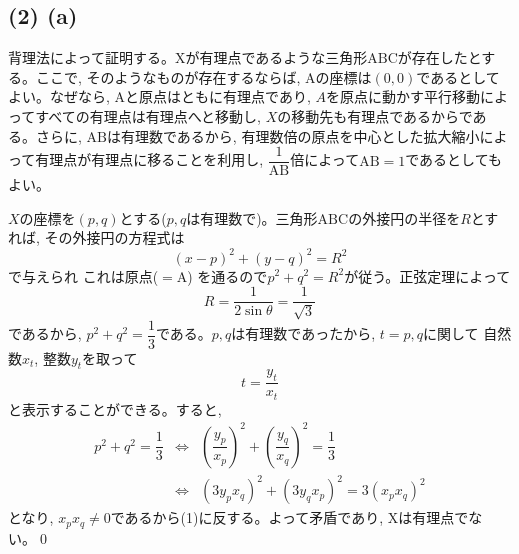 \documentclass[twocolumn]{jbook}
\theoremstyle{definition}
\newcommand{\beqn}{\begin{eqnarray*}}
\newcommand{\eeqn}{\end{eqnarray*}}
\newcommand{\mr}{\mathrm}
\newcommand{\parena}[1]{\left( #1\right)}
\begin{document}
\subsection*{(2) (a)} 背理法によって証明する。$\mr{X}$が有理点であるような三角形$\mr{ABC}$が存在したとする。ここで, そのようなものが存在するならば, $\mr{A}$の座標は$(0,0)$であるとしてよい。なぜなら, $\mr{A}$と原点はともに有理点であり, $A$を原点に動かす平行移動によってすべての有理点は有理点へと移動し, $X$の移動先も有理点であるからである。さらに, $\mr{AB}$は有理数であるから, 有理数倍の原点を中心とした拡大縮小によって有理点が有理点に移ることを利用し, $\dfrac{1}{\mr{AB}}$倍によって$\mr{AB}=1$であるとしてもよい。\par
$X$の座標を$(p,q)$とする($p,q$は有理数で)。三角形$\mr{ABC}$の外接円の半径を$R$とすれば, その外接円の方程式は
\[(x-p)^2 + (y-q)^2 = R^2\]
で与えられ これは原点($=\mr{A}$) を通るので$p^2 + q^2 = R^2$が従う。正弦定理によって
\[R = \dfrac{1}{2\sin{\theta}} = \dfrac{1}{\sqrt{3}}\]
であるから, $p^2 + q^2 = \dfrac{1}{3}$である。$p,q$は有理数であったから, $t=p,q$に関して 自然数$x_t$, 整数$y_t$を取って
\[t = \dfrac{y_t}{x_t}\]
と表示することができる。すると, 
\beqn
p^2+q^2 = \dfrac{1}{3} &\iff& \parena{\dfrac{y_p}{x_p}}^2 + \parena{\dfrac{y_q}{x_q}}^2 = \dfrac{1}{3}\\
&\iff& (3y_px_q)^2 + (3y_qx_p)^2 = 3(x_px_q)^2
\eeqn
となり, $x_px_q \neq 0$であるから(1)に反する。よって矛盾であり, $\mr{X}$は有理点でない。\qed
\end{document}
